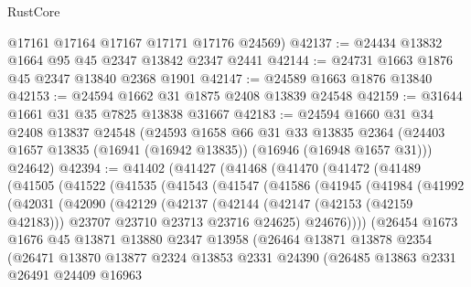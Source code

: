 \begin{lexlean}{RustCore}
\begin{coremodule}
      @17161
      @17164
      @17167
      @17171
      @17176
      @24569)
@42137 := @24434 @13832 @1664 @95 @45 @2347 @13842 @2347 @2441
@42144 := @24731 @1663 @1876 @45 @2347 @13840 @2368 @1901
@42147 := @24589 @1663 @1876 @13840
@42153 := @24594 @1662 @31 @1875 @2408 @13839 @24548
@42159 := @31644 @1661 @31 @35 @7825 @13838 @31667
@42183 := @24594
    @1660
    @31
    @34
    @2408
    @13837
    @24548
    (@24593
      @1658
      @66
      @31
      @33
      @13835
      @2364
      (@24403 @1657 @13835 (@16941 (@16942 @13835)) (@16946 (@16948 @1657 @31)))
      @24642)
@42394 := @41402
    (@41427
      (@41468
        (@41470
          (@41472
            (@41489
              (@41505
                (@41522
                  (@41535
                    (@41543
                      (@41547
                        (@41586
                          (@41945
                            (@41984
                              (@41992
                                (@42031
                                  (@42090
                                    (@42129
                                      (@42137
                                        (@42144
                                          (@42147 (@42153 (@42159 @42183)))
                                          @23707
                                          @23710
                                          @23713
                                          @23716
                                          @24625)
                                        @24676))))
                                (@26454
                                  @1673
                                  @1676
                                  @45
                                  @13871
                                  @13880
                                  @2347
                                  @13958
                                  (@26464
                                    @13871
                                    @13878
                                    @2354
                                    (@26471
                                      @13870
                                      @13877
                                      @2324
                                      @13853
                                      @2331
                                      @24390
                                      (@26485
                                        @13863
                                        @2331
                                        @26491
                                        @24409
                                        @16963

\end{coremodule}
\end{lexlean}
